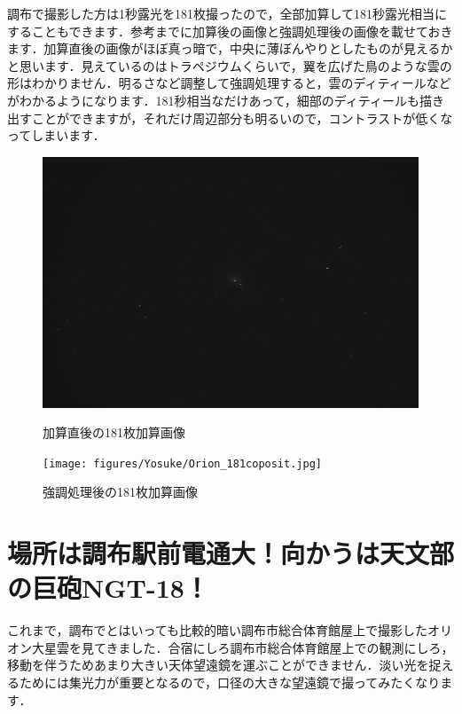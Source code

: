 \documentclass[supernova_2023]{subfiles}
\begin{document}
調布で撮影した方は1秒露光を181枚撮ったので，全部加算して181秒露光相当にすることもできます．参考までに加算後の画像と強調処理後の画像を載せておきます．加算直後の画像がほぼ真っ暗で，中央に薄ぼんやりとしたものが見えるかと思います．見えているのはトラペジウムくらいで，翼を広げた鳥のような雲の形はわかりません．明るさなど調整して強調処理すると，雲のディティールなどがわかるようになります．181秒相当なだけあって，細部のディティールも描き出すことができますが，それだけ周辺部分も明るいので，コントラストが低くなってしまいます．
\begin{figure}[H]
  \centering
  \begin{minipage}{0.4\columnwidth}
    \centering
    \includegraphics[width=\columnwidth]{figures/Yosuke/Orion_181coposit_non.jpg}
    \caption{加算直後の181枚加算画像}
    \label{fig:Orion_181coposit_non}
  \end{minipage}
  \begin{minipage}{0.4\columnwidth}
    \centering
    \texttt{[image: figures/Yosuke/Orion\_181coposit.jpg]}
    \caption{強調処理後の181枚加算画像}
    \label{fig:Orion_181coposit}
  \end{minipage}
\end{figure}

\section{場所は調布駅前電通大！向かうは天文部の巨砲NGT-18！}
これまで，調布でとはいっても比較的暗い調布市総合体育館屋上で撮影したオリオン大星雲を見てきました．合宿にしろ調布市総合体育館屋上での観測にしろ，移動を伴うためあまり大きい天体望遠鏡を運ぶことができません．淡い光を捉えるためには集光力が重要となるので，口径の大きな望遠鏡で撮ってみたくなります．
\end{document}

